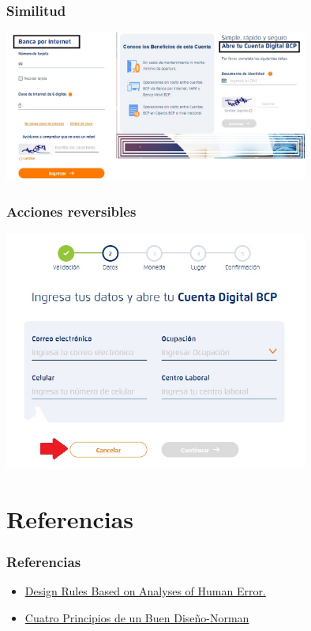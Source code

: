 \documentclass[11pt]{beamer}
\begin{document}
\begin{frame}
\frametitle{Similitud}

{\includegraphics[width=10.0cm]{img/similitud.jpg}}

\end{frame}

\begin{frame}
\frametitle{Acciones reversibles}

{\includegraphics[width=10.0cm]{img/reversible.jpg}}

\end{frame}

\section{Referencias}
\begin{frame}
\frametitle{Referencias}
\begin{itemize}
\item \href{https://www.researchgate.net/publication/220424605_Design_Rules_Based_on_Analyses_of_Human_Error}{Design Rules Based on Analyses of Human Error.}
\item \href{http://www.webnova.com.ar/los-cuatro-principios-del-buen-diseno-de-donald-norman/}{Cuatro Principios de un Buen Diseño-Norman}
\end{itemize}
\end{frame}
\end{document}
